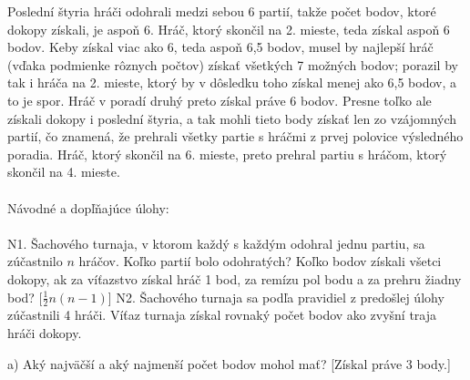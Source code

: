 \rieh Poslední štyria hráči odohrali medzi sebou 6 partií, takže počet bodov, ktoré dokopy získali, je aspoň 6. Hráč, ktorý skončil na 2. mieste, teda získal aspoň 6 bodov. Keby získal viac ako 6, teda aspoň 6,5 bodov, musel by najlepší hráč (vďaka podmienke rôznych počtov) získať všetkých 7 možných bodov; porazil by tak i hráča na 2. mieste, ktorý by v dôsledku toho získal menej ako 6,5 bodov, a to je spor. Hráč v poradí druhý preto získal práve 6 bodov. Presne toľko ale získali dokopy i poslední štyria, a tak mohli tieto body získať len zo vzájomných partií, čo znamená, že prehrali všetky partie s hráčmi z prvej polovice výsledného poradia. Hráč, ktorý skončil na 6. mieste, preto prehral partiu s hráčom, ktorý skončil na 4. mieste.\\
\\
Návodné a dopľňajúce úlohy:\\
\\
N1. Šachového turnaja, v ktorom každý s každým odohral jednu partiu, sa zúčastnilo $n$ hráčov. Koľko partií bolo odohratých? Koľko bodov získali všetci dokopy, ak za víťazstvo získal hráč 1 bod, za remízu pol bodu a za prehru žiadny bod? [$\frac{1}{2}n(n -1)$]
N2. Šachového turnaja sa podľa pravidiel z predošlej úlohy zúčastnili 4 hráči. Víťaz turnaja získal rovnaký počet bodov ako zvyšní traja hráči dokopy.

a) Aký najväčší a aký najmenší počet bodov mohol mať? [Získal práve 3 body.]

